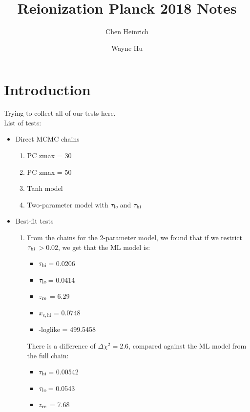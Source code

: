 \documentclass[prd,amsmath,amssymb,floatfix,superscriptaddress,nofootinbib]{revtex4-1}
\newcommand{\tauhi}{$\tau_{\rm hi}\,$}
\newcommand{\taulo}{$\tau_{\rm lo}\,$}
\begin{document}
	
\title{Reionization Planck 2018 Notes}

\author{Chen Heinrich}
\author{Wayne Hu}
 
\maketitle

\section{Introduction}
\label{sec:intro}

Trying to collect all of our tests here.\\

List of tests:\\
\begin{itemize}
    \item {Direct MCMC chains
        \begin{enumerate}
            \item {PC zmax = 30}
            \item {PC zmax = 50}
            \item{Tanh model}
            \item{Two-parameter model with \taulo and \tauhi}
        \end{enumerate}
    }
    \item{Best-fit tests
        \begin{enumerate}
            \item {From the chains for the 2-parameter model, we found that if we restrict \tauhi $> 0.02$, we get that the ML model is: 
            \begin{itemize}
                \item {\tauhi = 0.0206}
                \item {\taulo = 0.0414} 
                \item {$z_{\rm re}$ = 6.29} 
                \item {$x_{e, \mathrm{hi}}$ = 0.0748}
                \item {-loglike = 499.5458} 
            \end{itemize}
            There is a difference of $\Delta \chi^2 = 2.6$, compared against the ML model from the full chain:
            \begin{itemize}
                \item {\tauhi = 0.00542}
                \item {\taulo = 0.0543} 
                \item {$z_{\rm re}$ = 7.68} 

\end{itemize}}
\end{enumerate}}
\end{itemize}
\end{document}

